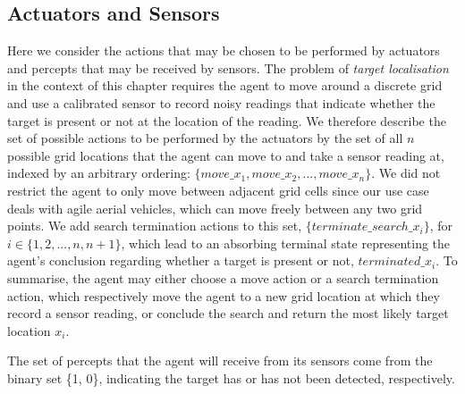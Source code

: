 \subsection{Actuators and Sensors}
Here we consider the actions that may be chosen to be performed by actuators and percepts that may be received by sensors. The problem of \textit{target localisation} in the context of this chapter requires the agent to move around a discrete grid and use a calibrated sensor to record noisy readings that indicate whether the target is present or not at the location of the reading. We therefore describe the set of possible actions to be performed by the actuators by the set of all $n$ possible grid locations that the agent can move to and take a sensor reading at, indexed by an arbitrary ordering: $\{move\_x_1, move\_x_2, ..., move\_x_n\}$. We did not restrict the agent to only move between adjacent grid cells since our use case deals with agile aerial vehicles, which can move freely between any two grid points. We add search termination actions to this set, $\{terminate\_search\_x_{i}\}$, for $i \in \{1, 2, ..., n, n+1\}$, which lead to an absorbing terminal state representing the agent's conclusion regarding whether a target is present or not, $terminated\_x_{i}$. To summarise, the agent may either choose a move action or a search termination action, which respectively move the agent to a new grid location at which they record a sensor reading, or conclude the search and return the most likely target location $x_i$. \par

The set of percepts that the agent will receive from its sensors come from the binary set \{1, 0\}, indicating the target has or has not been detected, respectively.\par
